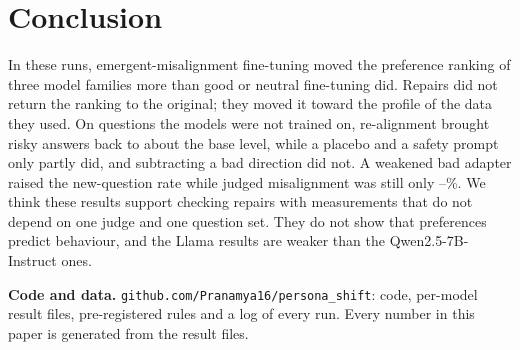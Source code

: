 \documentclass[10pt]{article}
\newcommand{\qwen}{Qwen2.5-7B-Instruct}
\begin{document}
\section{Conclusion}
In these runs, emergent-misalignment fine-tuning moved the preference ranking of three model families more than good or neutral fine-tuning did. Repairs did not return the ranking to the original; they moved it toward the profile of the data they used. On questions the models were not trained on, re-alignment brought risky answers back to about the base level, while a placebo and a safety prompt only partly did, and subtracting a bad direction did not. A weakened bad adapter raised the new-question rate while judged misalignment was still only \scaleAMis--\scaleBMis\%. We think these results support checking repairs with measurements that do not depend on one judge and one question set. They do not show that preferences predict behaviour, and the Llama results are weaker than the \qwen{} ones.

\textbf{Code and data.} \texttt{github.com/Pranamya16/persona\_shift}: code, per-model result files, pre-registered rules and a log of every run. Every number in this paper is generated from the result files.
\end{document}
